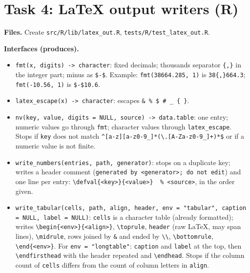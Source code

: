 \documentclass[10pt,a4paper]{article}
\newcommand{\f}[1]{\texttt{#1}}
\begin{document}
\section{Task 4: LaTeX output writers (R)}
\textbf{Files.} Create \f{src/R/lib/latex\_out.R}, \f{tests/R/test\_latex\_out.R}.

\textbf{Interfaces (produces).}
\begin{itemize}
\item \f{fmt(x, digits) -> character}: fixed decimals; thousands separator \verb|{,}| in the integer part; minus as
      \verb|$-$|. Example: \f{fmt(38664.285, 1)} is \verb|38{,}664.3|; \f{fmt(-10.56, 1)} is \verb|$-$10.6|.
\item \f{latex\_escape(x) -> character}: escapes \verb|& % $ # _ { }|.
\item \f{nv(key, value, digits = NULL, source) -> data.table}: one entry; numeric values go through \f{fmt};
      character values through \f{latex\_escape}. Stops if \f{key} does not match
      \verb|^[a-z][a-z0-9_]*(\.[A-Za-z0-9_]+)*$| or if a numeric value is not finite.
\item \f{write\_numbers(entries, path, generator)}: stops on a duplicate key; writes a header comment
      (\f{generated by <generator>; do not edit}) and one line per entry:
      \verb|\defval{<key>}{<value>}  % <source>|, in the order given.
\item \f{write\_tabular(cells, path, align, header, env = "tabular", caption = NULL, label = NULL)}: \f{cells} is a
      character table (already formatted); writes \verb|\begin{<env>}{<align>}|, \verb|\toprule|, \f{header}
      (raw LaTeX, may span lines), \verb|\midrule|, rows joined by \verb|&| and ended by \verb|\\|,
      \verb|\bottomrule|, \verb|\end{<env>}|. For \f{env = "longtable"}: \f{caption} and \f{label} at the top,
      then \verb|\endfirsthead| with the header repeated and \verb|\endhead|. Stops if the column count of
      \f{cells} differs from the count of column letters in \f{align}.
\end{itemize}
\end{document}
